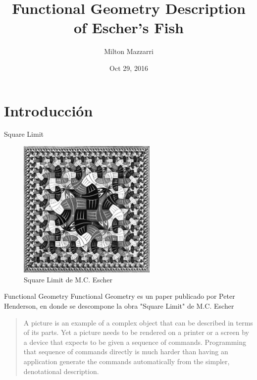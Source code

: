 \documentclass{beamer}
\title{Functional Geometry Description of Escher's Fish}
\date{Oct 29, 2016}
\author{Milton Mazzarri}
\institute{Mexico City Erlang Factory 2016}
\begin{document}
    \maketitle

    \section{Introducción}

    \begin{frame}{Square Limit}

        \begin{figure}
           \centering
            \includegraphics[width=0.6\textwidth]{./figs/square-limit}
            \caption{Square Limit de M.C. Escher}
            \label{fig:square_limit}
        \end{figure}
    \end{frame}

    \begin{frame}{Functional Geometry}
        Functional Geometry es un paper publicado por Peter Henderson\cite{Henderson82}, en donde se descompone la obra "Square
        Limit" de M.C. Escher
        \begin{quote}
            A picture is an example of a complex object that can be described
            in terms of its parts. Yet a picture needs to be rendered on a
            printer or a screen by a device that expects to be given a sequence
            of commands. Programming that sequence of commands directly is much
            harder than having an application generate the commands
            automatically from the simpler, denotational description.
        \end{quote}
    \end{frame}
\end{document}

